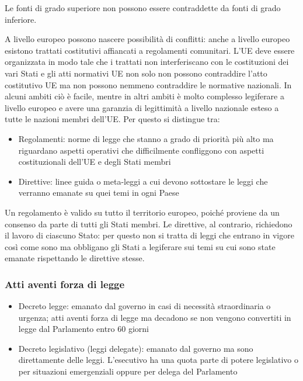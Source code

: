 Le fonti di grado superiore non possono essere contraddette da fonti di grado inferiore. 

A livello europeo possono nascere possibilità di conflitti: anche a livello europeo esistono trattati costitutivi affiancati a regolamenti comunitari. L'UE deve essere organizzata in modo tale che i trattati non interferiscano con le costituzioni dei vari Stati e gli atti normativi UE non solo non possono contraddire l'atto costitutivo UE ma non possono nemmeno contraddire le normative nazionali. In alcuni ambiti ciò è facile, mentre in altri ambiti è molto complesso legiferare a livello europeo e avere una garanzia di legittimità a livello nazionale esteso a tutte le nazioni membri dell'UE. 
Per questo si distingue tra:
\begin{itemize}
    \item Regolamenti: norme di legge che stanno a grado di priorità più alto ma riguardano aspetti operativi che difficilmente confliggono con aspetti costituzionali dell'UE e degli Stati membri
    \item Direttive: linee guida o meta-leggi a cui devono sottostare le leggi che verranno emanate su quei temi in ogni Paese
\end{itemize}

Un regolamento è valido su tutto il territorio europeo, poiché proviene da un consenso da parte di tutti gli Stati membri. Le direttive, al contrario, richiedono il lavoro di ciascuno Stato: per questo non si tratta di leggi che entrano in vigore così come sono ma obbligano gli Stati a legiferare sui temi su cui sono state emanate rispettando le direttive stesse.

\subsubsection{Atti aventi forza di legge}

\begin{itemize}
    \item Decreto legge: emanato dal governo in casi di necessità straordinaria o urgenza; atti aventi forza di legge ma decadono se non vengono convertiti in legge dal Parlamento entro 60 giorni
    \item Decreto legislativo (leggi delegate): emanato dal governo ma sono direttamente delle leggi. L'esecutivo ha una quota parte di potere legislativo o per situazioni emergenziali oppure per delega del Parlamento
\end{itemize}


